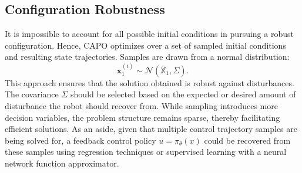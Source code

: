 \subsection{Configuration Robustness}\label{sec:method:ic}
It is impossible to account for all possible initial conditions in pursuing a robust configuration. Hence, CAPO optimizes over a set of sampled initial conditions and resulting state trajectories. Samples are drawn from a normal distribution:
\begin{equation}
\textbf{x}^{(i)}_1 \sim\mathcal{N}(\bar{\mathbb{X}}_1,\Sigma) .
\end{equation}
This approach ensures that the solution obtained is robust against disturbances. The covariance $\Sigma$ should be selected based on the expected or desired amount of disturbance the robot should recover from. While sampling introduces more decision variables, the problem structure remains sparse, thereby facilitating efficient solutions. As an aside, given that multiple control trajectory samples are being solved for, a feedback control policy $u = {\pi}_\theta(x)$ could be recovered from these samples using regression techniques or supervised learning with a neural network function approximator. 





